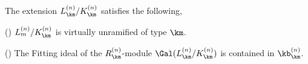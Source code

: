 \documentclass[article, a4paper, twoside]{universal}
\begin{document}
\begin{thm}
	The extension $L_{\km}^{(n)}/K_{\km}^{(n)}$ satisfies the following,
	\begin{itm}
		\item (\cite[5.4~Proposition~1]{MW1984}) $L_{m}^{(n)}/K_{\km}^{(n)}$ is virtually unramified of type $\km$.
		\item (\cite[5.5~Proposition~1]{MW1984}) The Fitting ideal of the $R_{\km}^{(n)}$-module $\Gal(L_{\km}^{(n)}/K_{\km}^{(n)})$ is contained in $\kb_{\km}^{(n)}$.
	\end{itm}
\end{thm}






\printref
\end{document}
